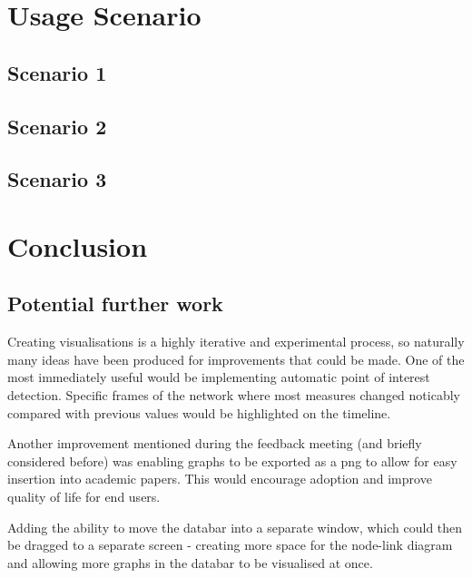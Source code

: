 
\chapter{Usage Scenario}

\section{Scenario 1} 

\section{Scenario 2} 

\section{Scenario 3} 


\chapter{Conclusion}

\section{Potential further work} 
Creating visualisations is a highly iterative and experimental process, so naturally many ideas have been produced for improvements that could be made. 
One of the most immediately useful would be implementing automatic point of interest detection. Specific frames of the network where most measures changed noticably compared with previous values would be highlighted on the timeline.
\newline

Another improvement mentioned during the feedback meeting (and briefly considered before) was enabling graphs to be exported as a png to allow for easy insertion into academic papers. This would encourage adoption and improve quality of life for end users.
\newline

Adding the ability to move the databar into a separate window, which could then be dragged to a separate screen - creating more space for the node-link diagram and allowing more graphs in the databar to be visualised at once. 
\newline

